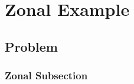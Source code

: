 \chapter{\label{ch:archetype modal}Zonal Example}

\section{\label{sec:zonal problem}Problem}  %

\subsection{\label{ssec:zonal subsection}Zonal Subsection}  %


\endinput